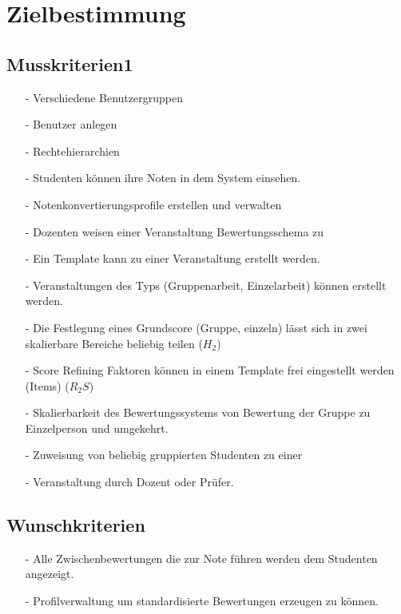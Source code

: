 


	
	\tableofcontents
	\newpage

	\section{Zielbestimmung}
		\subsection{Musskriterien1}			

			
			\begin{itemize}
			\item[-]	Verschiedene Benutzergruppen 
			\item[-]	Benutzer anlegen
			\item[-]	Rechtehierarchien
			\item[-]	Studenten können ihre Noten in dem System einsehen.
			\item[-]	Notenkonvertierungsprofile erstellen und verwalten
			\item[-]	Dozenten weisen einer Veranstaltung Bewertungsschema zu
			\item[-]	Ein Template kann zu einer Veranstaltung erstellt werden.
			\item[-]	Veranstaltungen des Typs (Gruppenarbeit, Einzelarbeit) können erstellt werden.
			\item[-]	Die Festlegung eines Grundscore (Gruppe, einzeln) lässt sich in zwei skalierbare \newline Bereiche beliebig teilen ($H_2$)
			\item[-]	Score Refining Faktoren können in einem Template frei eingestellt werden (Items) ($R_2S$)
			\item[-]	Skalierbarkeit des Bewertungssystems von Bewertung der Gruppe zu Einzelperson und umgekehrt.
			\item[-]	Zuweisung von beliebig gruppierten Studenten zu einer \item[-]	Veranstaltung durch Dozent oder Prüfer.				
			\end{itemize}

			
		\subsection{Wunschkriterien}
		\begin{itemize}
		\item[-]	Alle Zwischenbewertungen die zur Note führen werden dem Studenten angezeigt.
		\item[-]	Profilverwaltung um standardisierte Bewertungen erzeugen zu können.
		\end{itemize}
		
